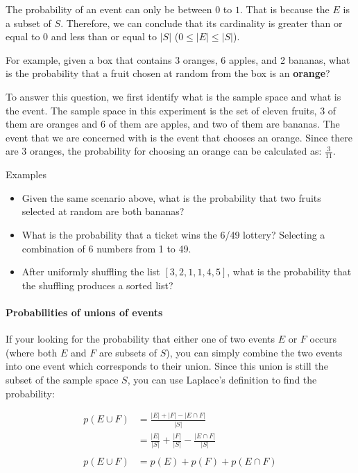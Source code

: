 The probability of an event can only be between \textbf{\(0\)} to
\textbf{\(1\)}. That is because the \textbf{\(E\)} is a subset of
\textbf{\(S\)}. Therefore, we can conclude that its cardinality is
greater than or equal to \textbf{\(0\)} and less than or equal to
\textbf{\(|S|\)} (\(0 \leq |E| \leq |S|\)).

For example, given a box that contains 3 oranges, 6 apples, and 2
bananas, what is the probability that a fruit chosen at random from the
box is an \textbf{orange}?

To answer this question, we first identify what is the sample space and
what is the event. The sample space in this experiment is the set of
eleven fruits, 3 of them are oranges and 6 of them are apples, and two
of them are bananas. The event that we are concerned with is the event
that chooses an orange. Since there are 3 oranges, the probability for
choosing an orange can be calculated as: \textbf{\(\frac{3}{11}\)}.

Examples

\begin{itemize}
\item
  Given the same scenario above, what is the probability that two fruits
  selected at random are both bananas?
\item
  What is the probability that a ticket wins the 6/49\hspace{0pt}
  lottery? Selecting a combination of 6 numbers from 1 to 49.
\item
  After uniformly shuffling the list \textbf{\([3,2,1,1,4,5]\)}, what is
  the probability that the shuffling produces a sorted list?
\end{itemize}

\hypertarget{probabilities-of-unions-of-events}{%
\paragraph{Probabilities of unions of
events}\label{probabilities-of-unions-of-events}}

If your looking for the probability that either one of two events
\textbf{\(E\)} or \textbf{\(F\)} occurs (where both \textbf{\(E\)} and
\textbf{\(F\)} are subsets of \textbf{\(S\)}), you can simply combine
the two events into one event which corresponds to their union. Since
this union is still the subset of the sample space \textbf{\(S\)}, you
can use Laplace's definition to find the probability:

\[
\begin{aligned}
    p(E \cup F) &= \frac{|E|+|F|-|E \cap F|}{|S|}\\
    &= \frac{|E|}{|S|}+\frac{|F|}{|S|}-\frac{|E \cap F|}{|S|}\\\\
    p(E \cup F) &= p(E) + p(F) + p(E \cap F)
\end{aligned}
\]

